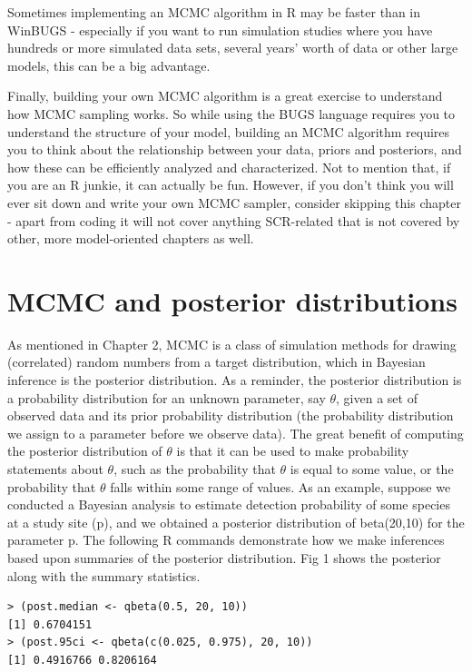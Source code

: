 Sometimes implementing an MCMC algorithm in R may be faster than in WinBUGS - especially if you want to run simulation studies where you have hundreds or more simulated data sets, several years' worth of data or other large models, this can be a big advantage. 

Finally, building your own MCMC algorithm is a great exercise to understand how MCMC sampling works. So while using the BUGS language requires you to understand the structure of your model, building an MCMC algorithm requires you to think about the relationship between your data, priors and posteriors, and how these can be efficiently analyzed and characterized. Not to mention that, if you are an R junkie, it can actually be fun.   
However, if you don't think you will ever sit down and write your own MCMC sampler, consider skipping this chapter - apart from coding it will not cover anything SCR-related that is not covered by other, more model-oriented chapters as well.


\section{MCMC and posterior distributions}

As mentioned in Chapter 2, MCMC is a class of simulation methods for drawing (correlated) random numbers from a target distribution, which in Bayesian inference is the posterior distribution. 
As a reminder, the posterior distribution is a probability
distribution for an unknown parameter, say $\theta$, given a set of
observed data and its prior probability distribution (the probability
distribution we assign to a parameter before we observe data).  The
great benefit of computing the posterior distribution of $\theta$ is
that it can be used to make probability statements about $\theta$,
such as the probability that $\theta$ is equal to some value, or the
probability that $\theta$ falls within some range of values. As an
example, suppose we conducted a Bayesian analysis to estimate
detection probability of some species at a study site (p), and we
obtained a posterior distribution of beta(20,10) for the parameter
p. The following R commands demonstrate how we make inferences based
upon summaries of the posterior distribution. Fig 1 shows the
posterior along with the summary statistics.

\begin{verbatim}
> (post.median <- qbeta(0.5, 20, 10))
[1] 0.6704151
> (post.95ci <- qbeta(c(0.025, 0.975), 20, 10))
[1] 0.4916766 0.8206164
\end{verbatim}

